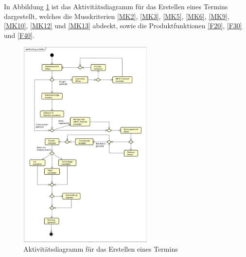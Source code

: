 In Abbildung \ref{fig:activity_diagram_booking} ist das Aktivitätsdiagramm für das Erstellen eines Termins dargestellt,
welches die Musskriterien \ref{MK2}, \ref{MK3}, \ref{MK5}, \ref{MK6}, \ref{MK9}, \ref{MK10}, \ref{MK12} und \ref{MK13} abdeckt,
sowie die Produktfunktionen \ref{F20}, \ref{F30} und \ref{F40}.
\begin{figure}[ht]
    \centering
    \includegraphics[width=0.6\textwidth]{figures/activitydiagrams/buchungerstellen}
    \caption{Aktivitätsdiagramm für das Erstellen eines Termins}
    \label{fig:activity_diagram_booking}
\end{figure}


\clearpage

